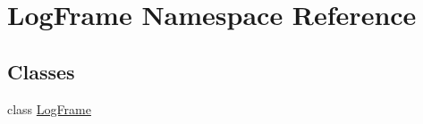 \hypertarget{namespaceLogFrame}{
\section{LogFrame Namespace Reference}
\label{namespaceLogFrame}
}
\subsection*{Classes}
\begin{DoxyCompactItemize}
\item 
class \hyperlink{classLogFrame_1_1LogFrame}{LogFrame}
\end{DoxyCompactItemize}
